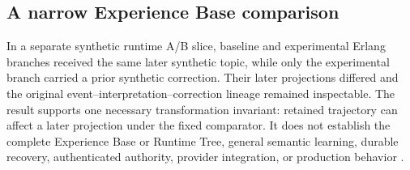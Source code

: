 \documentclass[10pt,a4paper]{article}
\begin{document}
\subsection{A narrow Experience Base comparison}

In a separate synthetic runtime A/B slice, baseline and experimental Erlang branches received the same later synthetic topic, while only the experimental branch carried a prior synthetic correction. Their later projections differed and the original event--interpretation--correction lineage remained inspectable. The result supports one necessary transformation invariant: retained trajectory can affect a later projection under the fixed comparator. It does not establish the complete Experience Base or Runtime Tree, general semantic learning, durable recovery, authenticated authority, provider integration, or production behavior \cite{liveexperiencereport}.
\end{document}
